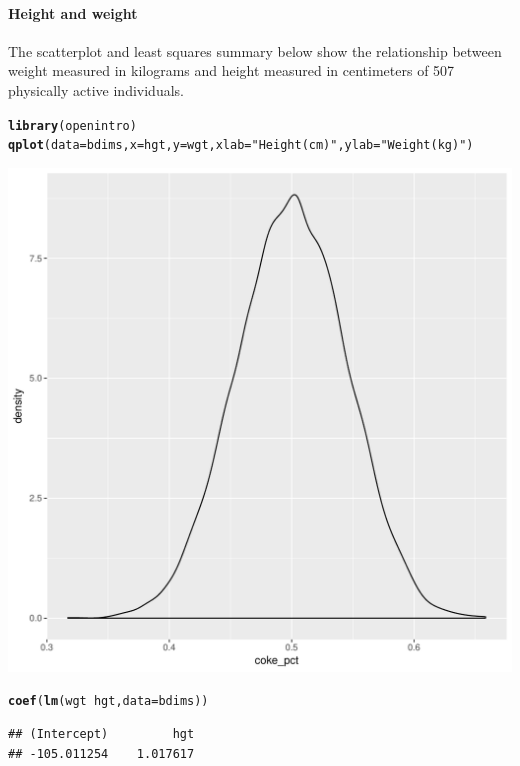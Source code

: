 \documentclass[10pt]{article}\usepackage[]{graphicx}\usepackage[]{color}
\makeatletter
\def\maxwidth{ %
  \ifdim\Gin@nat@width>\linewidth
    \linewidth
  \else
    \Gin@nat@width
  \fi
}
\newcommand{\hlstr}[1]{\textcolor[rgb]{0.192,0.494,0.8}{#1}}%
\newcommand{\hlopt}[1]{\textcolor[rgb]{0,0,0}{#1}}%
\newcommand{\hlstd}[1]{\textcolor[rgb]{0.345,0.345,0.345}{#1}}%
\newcommand{\hlkwc}[1]{\textcolor[rgb]{0.333,0.667,0.333}{#1}}%
\newcommand{\hlkwd}[1]{\textcolor[rgb]{0.737,0.353,0.396}{\textbf{#1}}}%
\newenvironment{kframe}{%
 \def\at@end@of@kframe{}%
 \ifinner\ifhmode%
  \def\at@end@of@kframe{\end{minipage}}%
  \begin{minipage}{\columnwidth}%
 \fi\fi%
 \def\FrameCommand##1{\hskip\@totalleftmargin \hskip-\fboxsep
 \colorbox{shadecolor}{##1}\hskip-\fboxsep
     \hskip-\linewidth \hskip-\@totalleftmargin \hskip\columnwidth}%
 \MakeFramed {\advance\hsize-\width
   \@totalleftmargin\z@ \linewidth\hsize
   \@setminipage}}%
 {\par\unskip\endMakeFramed%
 \at@end@of@kframe}
\newenvironment{knitrout}{}{} %
\makeatother
\begin{document}
\paragraph{Height and weight} The scatterplot and least squares summary below show the relationship between weight measured in kilograms and height measured in centimeters of 507 physically active individuals.
\begin{knitrout}\footnotesize
{}\color{fgcolor}\begin{kframe}
\begin{alltt}
\hlkwd{library}\hlstd{(openintro)}
\hlkwd{qplot}\hlstd{(}\hlkwc{data} \hlstd{= bdims,} \hlkwc{x} \hlstd{= hgt,} \hlkwc{y} \hlstd{= wgt,} \hlkwc{xlab} \hlstd{=} \hlstr{"Height (cm)"}\hlstd{,} \hlkwc{ylab} \hlstd{=} \hlstr{"Weight (kg)"}\hlstd{)}
\end{alltt}
\end{kframe}
\includegraphics[width=\maxwidth]{figure/unnamed-chunk-2-1} 
\begin{kframe}\begin{alltt}
\hlkwd{coef}\hlstd{(}\hlkwd{lm}\hlstd{(wgt} \hlopt{~} \hlstd{hgt,} \hlkwc{data} \hlstd{= bdims))}
\end{alltt}
\begin{verbatim}
## (Intercept)         hgt 
## -105.011254    1.017617
\end{verbatim}
\end{kframe}
\end{knitrout}
 
\end{document}

